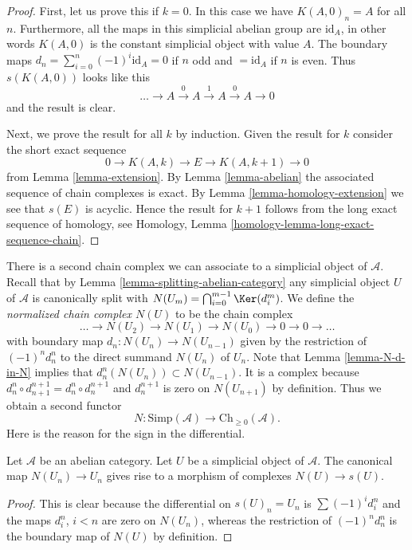 \begin{proof}
First, let us prove this if $k = 0$.
In this case we have $K(A, 0)_n = A$ for all $n$.
Furthermore, all the maps in this simplicial abelian
group are $\text{id}_A$, in other words $K(A, 0)$
is the constant simplicial object with value $A$.
The boundary maps $d_n = \sum_{i = 0}^n (-1)^i \text{id}_A
= 0$ if $n$ odd and $ = \text{id}_A$ if $n$ is even.
Thus $s(K(A, 0))$ looks like this
$$
\ldots \to A \xrightarrow{0} A \xrightarrow{1} A \xrightarrow{0} A \to 0
$$
and the result is clear.

\medskip\noindent
Next, we prove the result for all $k$ by induction.
Given the result for $k$ consider the short exact sequence
$$
0 \to K(A, k) \to E \to K(A, k + 1) \to 0
$$
from Lemma \ref{lemma-extension}.
By Lemma \ref{lemma-abelian} the associated sequence of
chain complexes is exact.
By Lemma \ref{lemma-homology-extension} we see that
$s(E)$ is acyclic. Hence the result for $k + 1$
follows from the long exact sequence of homology,
see Homology, Lemma \ref{homology-lemma-long-exact-sequence-chain}.
\end{proof}

\noindent
There is a second chain complex we can associate to
a simplicial object of $\mathcal{A}$. Recall that by
Lemma \ref{lemma-splitting-abelian-category}
any simplicial object $U$ of $\mathcal{A}$
is canonically split with
$N(U_m) = \bigcap_{i = 0}^{m - 1} \Ker(d^m_i)$.
We define the {\it normalized chain complex $N(U)$}
to be the chain complex
$$
\ldots \to N(U_2) \to N(U_1) \to N(U_0) \to 0 \to 0 \to \ldots
$$
with boundary map $d_n : N(U_n) \to N(U_{n - 1})$ given
by the restriction of $(-1)^nd^n_n$ to the direct summand
$N(U_n)$ of $U_n$. Note that Lemma \ref{lemma-N-d-in-N}
implies that $d^n_n(N(U_n)) \subset N(U_{n - 1})$.
It is a complex because
$d^n_n \circ d^{n + 1}_{n + 1} = d^n_n \circ d^{n + 1}_n$
and $d^{n + 1}_n$ is zero on $N(U_{n + 1})$ by definition.
Thus we obtain a second functor
$$
N : \text{Simp}(\mathcal{A}) \longrightarrow \text{Ch}_{\geq 0}(\mathcal{A}).
$$
Here is the reason for the sign in the differential.

\begin{lemma}
\label{lemma-map-associated-complexes}
Let $\mathcal{A}$ be an abelian category.
Let $U$ be a simplicial object of $\mathcal{A}$.
The canonical map $N(U_n) \to U_n$ gives rise to
a morphism of complexes $N(U) \to s(U)$.
\end{lemma}

\begin{proof}
This is clear because the differential
on $s(U)_n = U_n$ is $\sum (-1)^i d^n_i$ and
the maps $d^n_i$, $i < n$ are zero on $N(U_n)$,
whereas the restriction of $(-1)^nd^n_n$ is the boundary
map of $N(U)$ by definition.
\end{proof}

